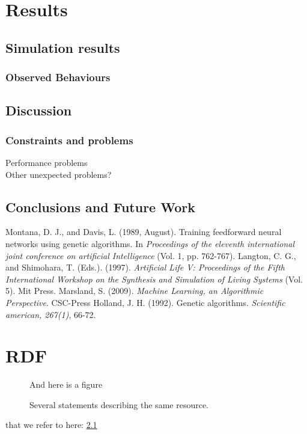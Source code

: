 \documentclass[a4paper,11pt]{kth-mag}
\begin{document}
\chapter{Results}
\section{Simulation results}
\subsection{Observed Behaviours}
\section{Discussion}
\subsection{Constraints and problems}
Performance problems\\
Other unexpected problems?\\

\section{Conclusions and Future Work}

\begin{thebibliography}{9}
Montana, D. J.,  and Davis, L. (1989, August). Training feedforward neural networks using genetic algorithms. In \emph{Proceedings of the eleventh international joint conference on artificial Intelligence} (Vol. 1, pp. 762-767).
Langton, C. G., and Shimohara, T. (Eds.). (1997). \emph{Artificial Life V: Proceedings of the Fifth International Workshop on the Synthesis and Simulation of Living Systems} (Vol. 5). Mit Press.
Marsland, S. (2009). \emph{Machine Learning, an Algorithmic Perspective}. CSC-Press
Holland, J. H. (1992). Genetic algorithms. \emph{Scientific american, 267(1)}, 66-72.


\end{thebibliography}

\appendix
\addappheadtotoc
\chapter{RDF}\label{appA}

\begin{figure}[ht]
\begin{center}
And here is a figure
\caption{\small{Several statements describing the same resource.}}\label{RDF_4}
\end{center}
\end{figure}

that we refer to here: \ref{RDF_4}
\end{document}
